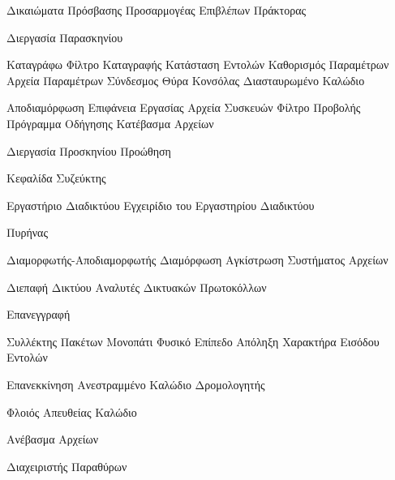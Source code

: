 
\gl
{}
{Δικαιώματα Πρόσβασης}
\gl
{}
{Προσαρμογέας}
\gl
{}
{Επιβλέπων}
\gl
{}
{Πράκτορας}


\gl
{}
{Διεργασία Παρασκηνίου}



\gl
{}
{Καταγράφω}
\gl
{}
{Φίλτρο Καταγραφής}
\gl
{}
{Κατάσταση Εντολών}
\gl
{}
{Καθορισμός Παραμέτρων}
\gl
{}
{Αρχεία Παραμέτρων}
\gl
{}
{Σύνδεσμος}
\gl
{}
{Θύρα Κονσόλας}
\gl
{}
{Διασταυρωμένο Καλώδιο}


\gl
{}
{Αποδιαμόρφωση}
\gl
{}
{Επιφάνεια Εργασίας}
\gl
{}
{Αρχεία Συσκευών}
\gl
{}
{Φίλτρο Προβολής}
\gl
{}
{Πρόγραμμα Οδήγησης}
\gl
{}
{Κατέβασμα Αρχείων}


\gl
{}
{Διεργασία Προσκηνίου}
\gl
{}
{Προώθηση}


\gl
{}
{Κεφαλίδα}
\gl
{}
{Συζεύκτης}

\gl
{}
{Εργαστήριο Διαδικτύου}
\gl
{}
{Εγχειρίδιο του Εργαστηρίου Διαδικτύου}

\gl
{}
{Πυρήνας}

\gl
{}
{Διαμορφωτής-Αποδιαμορφωτής}
\gl
{}
{Διαμόρφωση}
\gl
{}
{Αγκίστρωση Συστήματος Αρχείων}


\gl
{}
{Διεπαφή Δικτύου}
\gl
{}
{Αναλυτές Δικτυακών Πρωτοκόλλων}


\gl
{}
{Επανεγγραφή}



\gl
{}
{Συλλέκτης Πακέτων}
\gl
{}
{Μονοπάτι}
\gl
{}
{Φυσικό Επίπεδο}
\gl
{}
{Απόληξη}
\gl
{}
{Χαρακτήρα Εισόδου Εντολών}


\gl
{}
{Επανεκκίνηση}
\gl
{}
{Ανεστραμμένο Καλώδιο}
\gl
{}
{Δρομολογητής}




\gl
{}
{Φλοιός}
\gl
{}
{Απευθείας Καλώδιο}


\gl
{}
{Ανέβασμα Αρχείων}


\gl
{}
{Διαχειριστής Παραθύρων}
